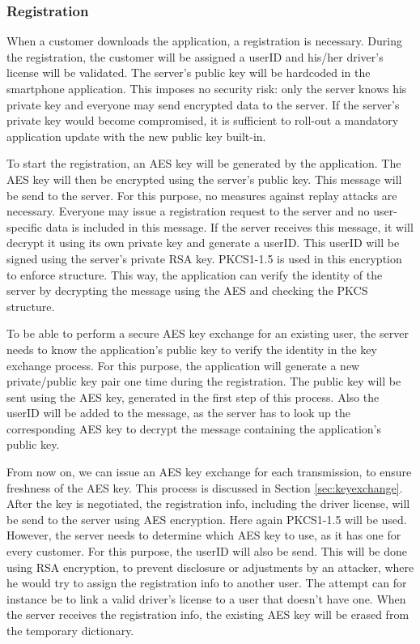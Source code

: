 \documentclass[12pt,a4paper, oneside]{article}
\begin{document}
\subsubsection{Registration}
When a customer downloads the application, a registration is necessary. During the registration, the customer will be assigned a userID and his/her driver's license will be validated. The server's public key will be hardcoded in the smartphone application. This imposes no security risk: only the server knows his private key and everyone may send encrypted data to the server. If the server's private key would become compromised, it is sufficient to roll-out a mandatory application update with the new public key built-in.
\par
To start the registration, an AES key will be generated by the application. The AES key will then be encrypted using the server's public key. This message will be send to the server. For this purpose, no measures against replay attacks are necessary. Everyone may issue a registration request to the server and no user-specific data is included in this message.
If the server receives this message, it will decrypt it using its own private key and generate a userID. This userID will be signed using the server's private RSA key. PKCS1-1.5 is used in this encryption to enforce structure. This way, the application can verify the identity of the server by decrypting the message using the AES and checking the PKCS structure. 
\par
To be able to perform a secure AES key exchange for an existing user, the server needs to know the application's public key to verify the identity in the key exchange process. For this purpose, the application will generate a new private/public key pair one time during the registration. The public key will be sent using the AES key, generated in the first step of this process. Also the userID will be added to the message, as the server has to look up the corresponding AES key to decrypt the message containing the application's public key.
\par
From now on, we can issue an AES key exchange for each transmission, to ensure freshness of the AES key. This process is discussed in Section \ref{sec:keyexchange}. After the key is negotiated, the registration info, including the driver license, will be send to the server using AES encryption. Here again PKCS1-1.5 will be used. However, the server needs to determine which AES key to use, as it has one for every customer. For this purpose, the userID will also be send. This will be done using RSA encryption, to prevent disclosure or adjustments by an attacker, where he would try to assign the registration info to another user. The attempt can for instance be to link a valid driver's license to a user that doesn't have one. When the server receives the registration info, the existing AES key will be erased from the temporary dictionary.  
\end{document}
